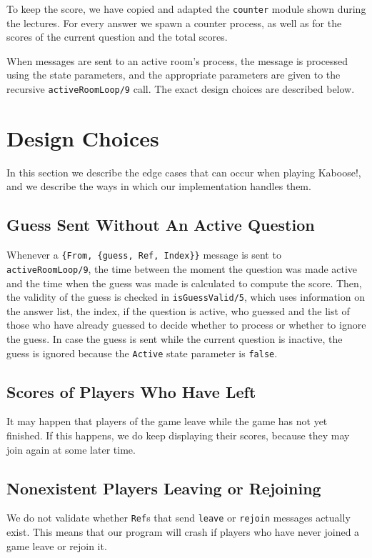 \documentclass{article}
\begin{document}
To keep the score, we have copied and adapted the \texttt{counter} module shown during the lectures. For every answer we spawn a counter process, as well as for the scores of the current question and the total scores.

When messages are sent to an active room's process, the message is processed using the state parameters, and the appropriate parameters are given to the recursive \texttt{activeRoomLoop/9} call. The exact design choices are described below.

\section{Design Choices}
In this section we describe the edge cases that can occur when playing Kaboose!, and we describe the ways in which our implementation handles them.

\subsection{Guess Sent Without An Active Question}
Whenever a \texttt{\{From, \{guess, Ref, Index\}\}} message is sent to \texttt{activeRoomLoop/9}, the time between the moment the question was made active and the time when the guess was made is calculated to compute the score. Then, the validity of the guess is checked in \texttt{isGuessValid/5}, which uses information on the answer list, the index, if the question is active, who guessed and the list of those who have already guessed to decide whether to process or whether to ignore the guess. In case the guess is sent while the current question is inactive, the guess is ignored because the \texttt{Active} state parameter is \texttt{false}.

\subsection{Scores of Players Who Have Left}
It may happen that players of the game leave while the game has not yet finished. If this happens, we do keep displaying their scores, because they may join again at some later time.

\subsection{Nonexistent Players Leaving or Rejoining}
We do not validate whether \texttt{Ref}s that send \texttt{leave} or \texttt{rejoin} messages actually exist. This means that our program will crash if players who have never joined a game leave or rejoin it.
\end{document}
